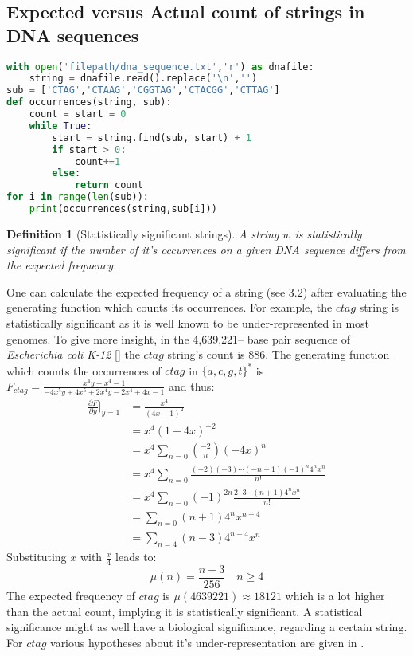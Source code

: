 \documentclass[12pt]{report}
\newtheorem{defn}[mythm]{Definition}
\begin{document}
{{\subsection{Expected versus Actual count of strings in DNA sequences}
{
\begin{lstlisting}[language=Python]
with open('filepath/dna_sequence.txt','r') as dnafile:
	string = dnafile.read().replace('\n','')
sub = ['CTAG','CTAAG','CGGTAG','CTACGG','CTTAG']
def occurrences(string, sub):
    count = start = 0
    while True:
        start = string.find(sub, start) + 1
        if start > 0:
            count+=1
        else:
            return count
for i in range(len(sub)):
	print(occurrences(string,sub[i]))
\end{lstlisting}}


\begin{defn}[Statistically significant strings]
A string $w$ is statistically significant if the number of it's occurrences on a given DNA sequence differs from the expected frequency.
\end{defn}

One can calculate the expected frequency of a string (see 3.2) after evaluating the generating function which counts its occurrences. For example, the $ctag$ string is statistically significant as it is well known to be under-represented in most genomes. To give more insight, in the 4,639,221– base pair sequence of {\em Escherichia coli K-12} [] the $ctag$ string's count is 886. The generating function which counts the occurrences of $ctag$ in $\{a,c,g,t\}^*$ is $F_{ctag}=\frac{x^4 y - x^4 - 1}{-4x^5y+4x^5+2x^4y-2x^4+4x-1}$ and thus:
\begin{align*}
\frac{\partial F}{ \partial y} \bigg\vert_{y=1}
&=\frac{x^4}{(4x - 1)^2} \\
&=x^4 (1-4x)^{-2} \\
&= x^4 \sum\limits_{n=0} \binom{-2}{n} (-4x)^n \\
&= x^4 \sum\limits_{n=0}  \frac{(-2)(-3) \cdots(-n-1) (-1)^n 4^n x^n}{n!} \\
&= x^4 \sum\limits_{n=0}  (-1)^{2n} \frac{2 \cdot 3\cdots (n+1) 4^n x^n}{n!} \\
&= \sum\limits_{n=0}  (n+1) 4^n x^{n+4} \\
&= \sum\limits_{n=4}  (n-3) 4^{n-4} x^n 
\end{align*}
Substituting $x$ with $\frac{x}{4}$ leads to: \[\mu(n)=\frac{n-3}{256} \quad n\geq 4 \]
The expected frequency of $ctag$ is $\mu(4639221) \approx 18121$ which is a lot higher than the actual count, implying it is statistically significant. A statistical significance might as well have a biological significance, regarding a certain string. For $ctag$ various hypotheses about it's under-representation are given in \cite{B1997}.

}}
\end{document}
